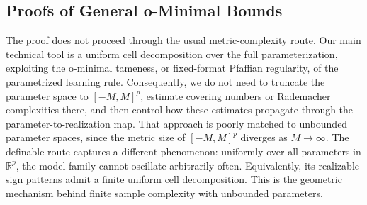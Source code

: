 \documentclass{article}
\theoremstyle{plain}
\theoremstyle{definition}
\theoremstyle{remark}
\theoremstyle{plain}
\numberwithin{thm}{section}
\theoremstyle{definition}
\numberwithin{equation}{section}
\begin{document}
\subsection{Proofs of General o-Minimal Bounds}
\label{s:Proofs__ss:ominimalGeneral}


The proof does not proceed through the usual metric-complexity route.  Our main technical tool is a uniform cell decomposition over the full parameterization, exploiting the o-minimal tameness, or fixed-format Pfaffian regularity, of the parametrized learning rule.  Consequently, we do not need to truncate the parameter space to $[-M,M]^p$, estimate covering numbers or Rademacher complexities there, and then control how these estimates propagate through the parameter-to-realization map.  That approach is poorly matched to unbounded parameter spaces, since the metric size of $[-M,M]^p$ diverges as $M\to\infty$.  The definable route captures a different phenomenon: uniformly over all parameters in $\mathbb{R}^p$, the model family cannot oscillate arbitrarily often.  Equivalently, its realizable sign patterns admit a finite uniform cell decomposition.  This is the geometric mechanism behind finite sample complexity with unbounded parameters.
\end{document}

